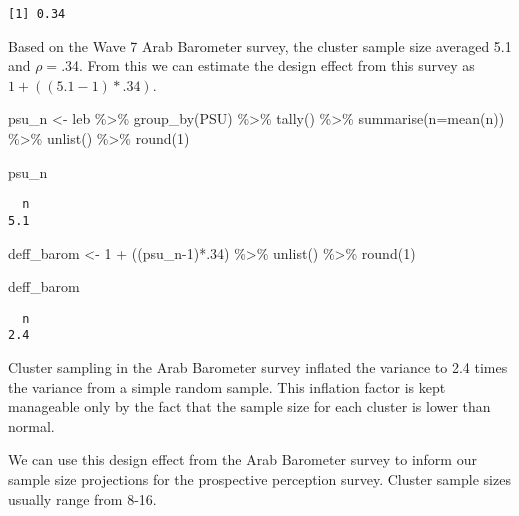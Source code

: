 \documentclass[
  letterpaper,
  DIV=11,
  numbers=noendperiod]{scrreprt}
\newenvironment{Shaded}{\begin{snugshade}}{\end{snugshade}}
\newcommand{\AttributeTok}[1]{\textcolor[rgb]{0.40,0.45,0.13}{#1}}
\newcommand{\DecValTok}[1]{\textcolor[rgb]{0.68,0.00,0.00}{#1}}
\newcommand{\FunctionTok}[1]{\textcolor[rgb]{0.28,0.35,0.67}{#1}}
\newcommand{\NormalTok}[1]{\textcolor[rgb]{0.00,0.23,0.31}{#1}}
\newcommand{\OtherTok}[1]{\textcolor[rgb]{0.00,0.23,0.31}{#1}}
\newcommand{\SpecialCharTok}[1]{\textcolor[rgb]{0.37,0.37,0.37}{#1}}
\begin{document}
\begin{verbatim}
[1] 0.34
\end{verbatim}

Based on the Wave 7 Arab Barometer survey, the cluster sample size
averaged 5.1 and \(\rho=\).34. From this we can estimate the design
effect from this survey as \(1+((5.1-1)*.34)\).

\begin{Shaded}
\begin{Highlighting}[]
\NormalTok{psu\_n }\OtherTok{\textless{}{-}}\NormalTok{ leb }\SpecialCharTok{\%\textgreater{}\%}
  \FunctionTok{group\_by}\NormalTok{(PSU) }\SpecialCharTok{\%\textgreater{}\%}
  \FunctionTok{tally}\NormalTok{() }\SpecialCharTok{\%\textgreater{}\%}
  \FunctionTok{summarise}\NormalTok{(}\AttributeTok{n=}\FunctionTok{mean}\NormalTok{(n)) }\SpecialCharTok{\%\textgreater{}\%}
  \FunctionTok{unlist}\NormalTok{() }\SpecialCharTok{\%\textgreater{}\%}
  \FunctionTok{round}\NormalTok{(}\DecValTok{1}\NormalTok{)}

\NormalTok{psu\_n  }
\end{Highlighting}
\end{Shaded}

\begin{verbatim}
  n 
5.1 
\end{verbatim}

\begin{Shaded}
\begin{Highlighting}[]
\NormalTok{deff\_barom }\OtherTok{\textless{}{-}} \DecValTok{1} \SpecialCharTok{+}\NormalTok{ ((psu\_n}\DecValTok{{-}1}\NormalTok{)}\SpecialCharTok{*}\NormalTok{.}\DecValTok{34}\NormalTok{) }\SpecialCharTok{\%\textgreater{}\%} 
  \FunctionTok{unlist}\NormalTok{() }\SpecialCharTok{\%\textgreater{}\%} 
  \FunctionTok{round}\NormalTok{(}\DecValTok{1}\NormalTok{)}

\NormalTok{deff\_barom }
\end{Highlighting}
\end{Shaded}

\begin{verbatim}
  n 
2.4 
\end{verbatim}

Cluster sampling in the Arab Barometer survey inflated the variance to
2.4 times the variance from a simple random sample. This inflation
factor is kept manageable only by the fact that the sample size for each
cluster is lower than normal.

We can use this design effect from the Arab Barometer survey to inform
our sample size projections for the prospective perception survey.
Cluster sample sizes usually range from 8-16.
\end{document}
